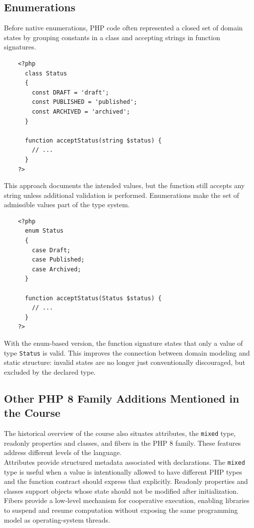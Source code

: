 \documentclass{scrbook}
\begin{document}
	\subsection{Enumerations}
	
	Before native enumerations, PHP code often represented a closed set of domain states by grouping constants in a class and accepting strings in function signatures.
	
	\begin{lstlisting}
	<?php
	  class Status
	  {
		const DRAFT = 'draft';
		const PUBLISHED = 'published';
		const ARCHIVED = 'archived';
	  }
	
	  function acceptStatus(string $status) {
		// ...
	  }
	?>
	\end{lstlisting}
	
	This approach documents the intended values, but the function still accepts any string unless additional validation is performed. Enumerations make the set of admissible values part of the type system.
	
	\begin{lstlisting}
	<?php
	  enum Status
	  {
		case Draft;
		case Published;
		case Archived;
	  }
	
	  function acceptStatus(Status $status) {
		// ...
	  }
	?>
	\end{lstlisting}
	
	With the enum-based version, the function signature states that only a value of type \texttt{Status} is valid. This improves the connection between domain modeling and static structure: invalid states are no longer just conventionally discouraged, but excluded by the declared type.
	
	\subsection{Other PHP 8 Family Additions Mentioned in the Course}
	
	The historical overview of the course also situates attributes, the \texttt{mixed} type, readonly properties and classes, and fibers in the PHP 8 family. These features address different levels of the language.\\
	
	Attributes provide structured metadata associated with declarations. The \texttt{mixed} type is useful when a value is intentionally allowed to have different PHP types and the function contract should express that explicitly. Readonly properties and classes support objects whose state should not be modified after initialization. Fibers provide a low-level mechanism for cooperative execution, enabling libraries to suspend and resume computation without exposing the same programming model as operating-system threads.\\
	
\end{document}
